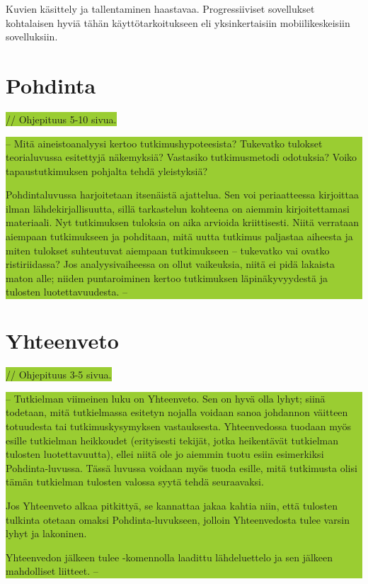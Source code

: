 \documentclass[utf8]{gradu3}
\begin{document}
Kuvien käsittely ja tallentaminen haastavaa. Progressiiviset sovellukset kohtalaisen hyviä tähän käyttötarkoitukseen eli yksinkertaisiin mobiilikeskeisiin sovelluksiin.


\chapter{Pohdinta}
\colorbox{YellowGreen}{// Ohjepituus 5-10 sivua.}

\colorbox{YellowGreen}{-- Mitä aineistoanalyysi kertoo tutkimushypoteesista? Tukevatko tulokset teorialuvussa esitettyjä näkemyksiä? Vastasiko tutkimusmetodi odotuksia? Voiko tapaustutkimuksen pohjalta tehdä yleistyksiä?

Pohdintaluvussa harjoitetaan itsenäistä ajattelua. Sen voi periaatteessa kirjoittaa ilman lähdekirjallisuutta, sillä tarkastelun kohteena on aiemmin kirjoitettamasi materiaali. Nyt tutkimuksen tuloksia on aika arvioida kriittisesti. Niitä verrataan aiempaan tutkimukseen ja pohditaan, mitä uutta tutkimus paljastaa aiheesta ja miten tulokset suhteutuvat aiempaan tutkimukseen – tukevatko vai ovatko ristiriidassa? Jos analyysivaiheessa on ollut vaikeuksia, niitä ei pidä lakaista maton alle; niiden puntaroiminen kertoo tutkimuksen läpinäkyvyydestä ja tulosten luotettavuudesta. --}


\chapter{Yhteenveto}
\colorbox{YellowGreen}{// Ohjepituus 3-5 sivua.}

\colorbox{YellowGreen}{-- Tutkielman viimeinen luku on Yhteenveto.  Sen on hyvä olla lyhyt; siinä todetaan, mitä tutkielmassa esitetyn nojalla voidaan sanoa johdannon väitteen totuudesta tai tutkimuskysymyksen vastauksesta. Yhteenvedossa tuodaan myös esille tutkielman heikkoudet (erityisesti tekijät, jotka heikentävät tutkielman tulosten luotettavuutta), ellei niitä ole jo aiemmin tuotu esiin esimerkiksi Pohdinta-luvussa. Tässä luvussa voidaan myös tuoda esille, mitä tutkimusta olisi tämän tutkielman tulosten valossa syytä tehdä seuraavaksi.

Jos Yhteenveto alkaa pitkittyä, se kannattaa jakaa kahtia niin, että tulosten tulkinta otetaan omaksi Pohdinta-luvukseen, jolloin Yhteenvedosta tulee varsin lyhyt ja lakoninen.

Yhteenvedon jälkeen tulee \string\printbibliography-komennolla laadittu lähdeluettelo ja sen jälkeen mahdolliset liitteet. --}


\printbibliography

%

\appendix
\end{document}
